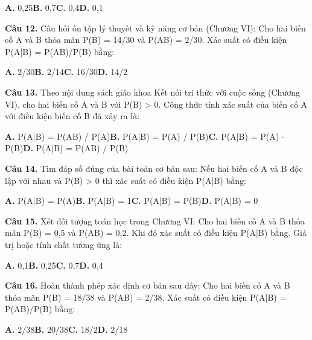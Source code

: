 \documentclass[11pt,a4paper]{article}
\begin{document}
\hspace*{1.5em}\textbf{A.} 0,25\quad\quad \textbf{B.} 0,7\quad\quad \textbf{C.} 0,4\quad\quad \textbf{D.} 0,1\par\vspace{2pt}
\textbf{\color{primary} Câu 12.} Câu hỏi ôn tập lý thuyết và kỹ năng cơ bản (Chương VI): Cho hai biến cố A và B thỏa mãn P(B) = 14/30 và P(AB) = 2/30. Xác suất có điều kiện P(A|B) = P(AB)/P(B) bằng:\par
\hspace*{1.5em}\textbf{A.} 2/30\quad\quad \textbf{B.} 2/14\quad\quad \textbf{C.} 16/30\quad\quad \textbf{D.} 14/2\par\vspace{2pt}
\textbf{\color{primary} Câu 13.} Theo nội dung sách giáo khoa Kết nối tri thức với cuộc sống (Chương VI), cho hai biến cố A và B với P(B) > 0. Công thức tính xác suất của biến cố A với điều kiện biến cố B đã xảy ra là:\par
\hspace*{1.5em}\textbf{A.} P(A|B) = P(AB) / P(A)\quad\quad \textbf{B.} P(A|B) = P(A) / P(B)\quad\quad \textbf{C.} P(A|B) = P(A) $\cdot$ P(B)\quad\quad \textbf{D.} P(A|B) = P(AB) / P(B)\par\vspace{2pt}
\textbf{\color{primary} Câu 14.} Tìm đáp số đúng của bài toán cơ bản sau: Nếu hai biến cố A và B độc lập với nhau và P(B) > 0 thì xác suất có điều kiện P(A|B) bằng:\par
\hspace*{1.5em}\textbf{A.} P(A|B) = P(A)\quad\quad \textbf{B.} P(A|B) = 1\quad\quad \textbf{C.} P(A|B) = P(B)\quad\quad \textbf{D.} P(A|B) = 0\par\vspace{2pt}
\textbf{\color{primary} Câu 15.} Xét đối tượng toán học trong Chương VI: Cho hai biến cố A và B thỏa mãn P(B) = 0,5 và P(AB) = 0,2. Khi đó xác suất có điều kiện P(A|B) bằng. Giá trị hoặc tính chất tương ứng là:\par
\hspace*{1.5em}\textbf{A.} 0,1\quad\quad \textbf{B.} 0,25\quad\quad \textbf{C.} 0,7\quad\quad \textbf{D.} 0,4\par\vspace{2pt}
\textbf{\color{primary} Câu 16.} Hoàn thành phép xác định cơ bản sau đây: Cho hai biến cố A và B thỏa mãn P(B) = 18/38 và P(AB) = 2/38. Xác suất có điều kiện P(A|B) = P(AB)/P(B) bằng:\par
\hspace*{1.5em}\textbf{A.} 2/38\quad\quad \textbf{B.} 20/38\quad\quad \textbf{C.} 18/2\quad\quad \textbf{D.} 2/18\par\vspace{2pt}
\end{document}
